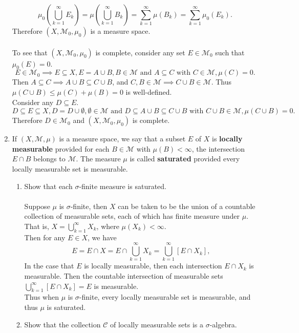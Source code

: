 \begin{enumerate}
	\[
		\mu_0(\bigcup_{k=1}^\infty E_k)=\mu(\bigcup_{k=1}^\infty B_k)=\sum_{k=1}^\infty\mu(B_k)=\sum_{k=1}^\infty\mu_0(E_k).
	\]
	Therefore $(X,\mathcal{M}_0,\mu_0)$ is a measure space.\\
	\\To see that $(X,\mathcal{M}_0,\mu_0)$ is complete, consider any set $E\in\mathcal{M}_0$ such that $\mu_0(E)=0$.
	\[
		E\in\mathcal{M}_0\implies E\subseteq X,E=A\cup B, B\in\mathcal{M}\text{ and }A\subseteq C\text{ with }C\in\mathcal{M}, \mu(C)=0.
	\]
	Then $A\subseteq C\implies A\cup B\subseteq C\cup B$, and $C,B\in\mathcal{M}\implies C\cup B\in\mathcal{M}$.
	Thus $\mu(C\cup B)\le \mu(C)+\mu(B)=0$ is well-defined.
	\\Consider any $D\subseteq E$.
	\[
		D\subseteq E\subseteq X,D=D\cup \emptyset, \emptyset\in\mathcal{M}\text{ and }D\subseteq A\cup B\subseteq C\cup B\text{ with }C\cup B\in\mathcal{M}, \mu(C\cup B)=0.
	\]
	Therefore $D\in \mathcal{M}_0$ and $(X,\mathcal{M}_0,\mu_0)$ is complete.
	\item If $(X,\mathcal{M},\mu)$ is a measure space, we say that a subset $E$ of $X$ is \textbf{locally measurable} provided for each $B\in\mathcal{M}$ with $\mu(B)<\infty$, the intersection $E\cap B$ belongs to $\mathcal{M}$.
	The measure $\mu$ is called \textbf{saturated} provided every locally measurable set is measurable.
	\begin{enumerate}[label=(\roman*),align=left]  
		\item Show that each $\sigma$-finite measure is saturated.\\
		\\Suppose $\mu$ is $\sigma$-finite, then $X$ can be taken to be the union of a countable collection of measurable sets, each of which has finite measure under $\mu$.
		\\That is, $X=\bigcup_{k=1}^\infty X_k$, where $\mu(X_k)<\infty$.
		\\Then for any $E\in X$, we have 
		\[
			E=E\cap X = E\cap \bigcup_{k=1}^\infty X_k = \bigcup_{k=1}^\infty[E\cap X_k],
		\]
		In the case that $E$ is locally measurable, then each intersection $E\cap X_k$ is measurable.
		Then the countable intersection of measurable sets $\bigcup_{k=1}^\infty[E\cap X_k]=E$ is measurable.
		\\Thus when $\mu$ is $\sigma$-finite, every locally measurable set is measurable, and thus $\mu$ is saturated.
		\item Show that the collection $\mathcal{C}$ of locally measurable sets is a $\sigma$-algebra.\\

\end{enumerate}
\end{enumerate}
